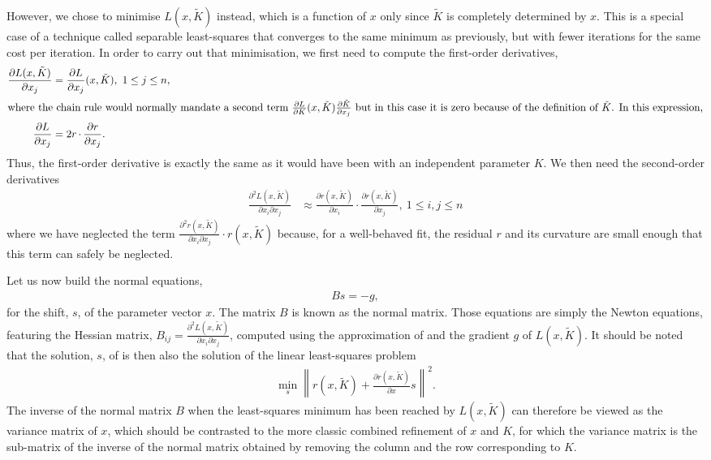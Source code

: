\documentclass[11pt]{article}
\newcommand{\norm}[1]{\left\| #1 \right\|}
\DeclareMathOperator{\dotprod}{\cdot}
\newcommand{\partialder}[2]{\frac{\partial #1}{\partial #2}}
\newcommand{\partialderxy}[3]{\frac{\partial^2 #1}{\partial #2 \partial #3}}
\begin{document}
However, we chose to minimise $L(x, \tilde{K})$ instead, which is a function of $x$ only since $\tilde{K}$ is completely determined by $x$. This is a special case of a technique called separable least-squares \cite[and references therein]{Nielsen:2000fr} that  converges to the same minimum as previously, but with fewer iterations for the same cost per iteration. In order to carry out that minimisation, we first need to compute the first-order derivatives,
\begin{align}
\partialder{L(x, \tilde{K})}{x_j} &= \partialder{L}{x_j}(x, \tilde{K}),\ 1 \le j \le n, \\
\intertext{where the chain rule would normally mandate a second term $\partialder{L}{K}(x, \tilde{K})\partialder{\tilde{K}}{x_j}$ but in this case it is zero because of the definition of $\tilde{K}$. In this expression,}
\partialder{L}{x_j} &= 2 r \dotprod \partialder{r}{x_j}.
\end{align}
Thus, the first-order derivative is exactly the same as it would have been with an independent parameter $K$. We then need the second-order derivatives
\begin{align}
\partialderxy{L(x, \tilde{K})}{x_i}{x_j} &\approx \partialder{r(x, \tilde{K})}{x_i} \dotprod \partialder{r(x, \tilde{K})}{x_j},\ 1 \le i,j \le n
\label{eqn:gaussleastsquares}
\end{align}
where we have neglected the term $\partialderxy{r(x, \tilde{K})}{x_i}{x_j} \dotprod r(x, \tilde{K})$ because, for a well-behaved fit, the residual $r$ and its curvature are small enough that this term can safely be neglected.

Let us now build the normal equations, 
\begin{align}
\label{eqn:gaussnewtoneq}
Bs = -g,
\end{align}
for the shift, $s$, of the parameter vector $x$. The matrix $B$ is known as the normal matrix. Those equations are simply the Newton equations, featuring the Hessian matrix, $B_{ij} = \partialderxy{L(x, \tilde{K})}{x_i}{x_j}$, computed using the approximation of  and the gradient $g$ of $L(x, \tilde{K})$. It should be noted that the solution, $s$, of  is then also the solution of the linear least-squares problem
\begin{align}
\label{eqn:gaussnewtonaslinearls}
\min_s \norm{r(x, \tilde{K}) + \partialder{r(x, \tilde{K})}{x} s}^2.
\end{align}
The inverse of the normal matrix $B$ when the least-squares minimum has been reached by $L(x, \tilde{K})$ can therefore be viewed as the variance matrix of $x$, which should be contrasted to the more classic combined refinement of $x$ and $K$, for which the variance matrix is the sub-matrix of the inverse of the normal matrix obtained by removing the column and the row corresponding to $K$. 
\end{document}
